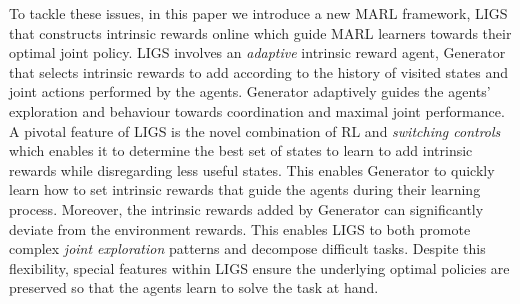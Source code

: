 \documentclass{article}
\begin{document}
To tackle these issues, in this paper we introduce a new MARL framework, LIGS that constructs intrinsic rewards online which guide MARL learners towards their optimal joint policy. LIGS involves an \textit{adaptive} intrinsic reward agent, 
{\selectfont Generator} that selects intrinsic rewards to add according to the history of visited states and joint actions performed by the agents. {\selectfont Generator} adaptively guides the agents' exploration and behaviour towards coordination and maximal joint performance. A pivotal feature of LIGS is the novel combination of RL and \textit{switching controls} \cite{bayraktar2010one,mguni2018viscosity} which enables it to determine the best set of states to learn to add intrinsic rewards while disregarding less useful states. This enables {\selectfont Generator} to quickly learn how to set intrinsic rewards that guide the agents during their learning process.  
Moreover, the intrinsic rewards added by {\selectfont Generator} can significantly deviate from the environment rewards. This enables LIGS to both promote complex \textit{joint exploration} patterns and decompose difficult tasks. Despite this flexibility, special features within LIGS ensure the underlying optimal policies are preserved so that the agents learn to solve the task at hand.   



\end{document}

